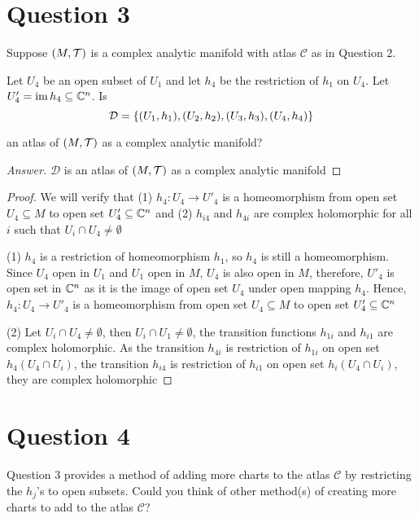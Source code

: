 \documentclass{article}
\begin{document}
\section{Question 3}

Suppose $(M, \mathcal{T})$ is a complex analytic manifold with atlas $\mathcal{C}$ as in Question 2.

Let $U_4$ be an open subset of $U_1$ and let $h_4$ be the restriction of $h_1$ on $U_4$. Let $U'_4 = \operatorname{im} h_4 \subseteq \mathbb{C}^n$. Is
$$
    \mathcal{D} = \{(U_1, h_1), (U_2, h_2), (U_3, h_3), (U_4, h_4)\}
$$

an atlas of $(M, \mathcal{T})$ as a complex analytic manifold?

\begin{proof}[Answer]
    $\mathcal{D}$ is an atlas of $(M, \mathcal{T})$ as a complex analytic manifold
\end{proof}

\begin{proof}
    We will verify that (1) $h_4: U_4 \to U'_4$ is a homeomorphism from open set $U_4 \subseteq M$ to open set $U'_4 \subseteq \mathbb{C}^n$ and (2) $h_{i4}$ and $h_{4i}$ are complex holomorphic for all $i$ such that $U_i \cap U_4 \neq \emptyset$

    (1) $h_4$ is a restriction of homeomorphism $h_1$, so $h_4$ is still a homeomorphism. Since $U_4$ open in $U_1$ and $U_1$ open in $M$, $U_4$ is also open in $M$, therefore, $U'_4$ is open set in $\mathbb{C}^n$ as it is the image of open set $U_4$ under open mapping $h_4$. Hence, $h_4: U_4 \to U'_4$ is a homeomorphism from open set $U_4 \subseteq M$ to open set $U'_4 \subseteq \mathbb{C}^n$

    (2) Let $U_i \cap U_4 \neq \emptyset$, then $U_i \cap U_1 \neq \emptyset$, the transition functions $h_{1i}$ and $h_{i1}$ are complex holomorphic. As the transition $h_{4i}$ is restriction of $h_{1i}$ on open set $h_4(U_4 \cap U_i)$, the transition $h_{i4}$ is restriction of $h_{i1}$ on open set $h_i(U_4 \cap U_i)$, they are complex holomorphic
    
\end{proof}

\section{Question 4}
Question 3 provides a method of adding more charts to the atlas $\mathcal{C}$ by restricting the $h_j$’s to open subsets.
Could you think of other method(s) of creating more charts to add to the atlas $\mathcal{C}$?
\end{document}
